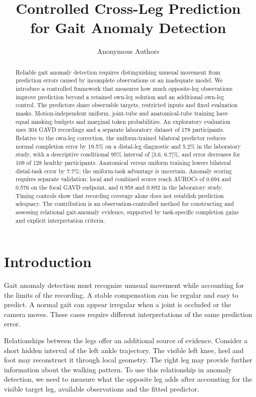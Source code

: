 \documentclass[letterpaper]{article}
\title{Controlled Cross-Leg Prediction for Gait Anomaly Detection}
\author{Anonymous Authors}
\begin{document}
\maketitle
\begin{abstract}
Reliable gait anomaly detection requires distinguishing unusual movement from prediction errors caused by incomplete observations or an inadequate model. We introduce a controlled framework that measures how much opposite-leg observations improve prediction beyond a retained own-leg solution and an additional own-leg control. The predictors share observable targets, restricted inputs and fixed evaluation masks. Motion-independent uniform, joint-tube and anatomical-tube training have equal masking budgets and marginal token probabilities. An exploratory evaluation uses 304 GAVD recordings and a separate laboratory dataset of 178 participants. Relative to the own-leg correction, the uniform-trained bilateral predictor reduces normal completion error by 19.5\% on a distal-leg diagnostic and 5.2\% in the laboratory study, with a descriptive conditional 95\% interval of {[}3.6, 6.7{]}\%, and error decreases for 109 of 128 healthy participants. Anatomical versus uniform training lowers bilateral distal-task error by 7.7\%; the uniform-task advantage is uncertain. Anomaly scoring requires separate validation: local and combined scores reach AUROCs of 0.694 and 0.576 on the focal GAVD endpoint, and 0.958 and 0.892 in the laboratory study. Timing controls show that recording coverage alone does not establish prediction adequacy. The contribution is an observation-controlled method for constructing and assessing relational gait-anomaly evidence, supported by task-specific completion gains and explicit interpretation criteria.
\end{abstract}
\section{Introduction}

Gait anomaly detection must recognize unusual movement while accounting for the limits of the recording. A stable compensation can be regular and easy to predict. A normal gait can appear irregular when a joint is occluded or the camera moves. These cases require different interpretations of the same prediction error.

Relationships between the legs offer an additional source of evidence. Consider a short hidden interval of the left ankle trajectory. The visible left knee, heel and foot may reconstruct it through local geometry. The right leg may provide further information about the walking pattern. To use this relationship in anomaly detection, we need to measure what the opposite leg adds after accounting for the visible target leg, available observations and the fitted predictor.
\end{document}
